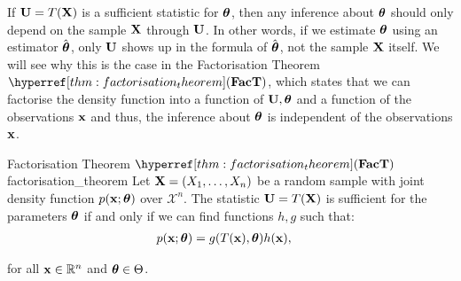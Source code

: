 \begin{definition}
    If ${\bf U}=T({\bf X})$ is a sufficient statistic for $\boldsymbol{\theta}$, then any inference about $\boldsymbol{\theta}$ should only depend on the sample ${\bf X}$ through ${\bf U}$. \color{blue}In other words, if we estimate $\boldsymbol{\theta}$ using an estimator $\hat{\boldsymbol{\theta}}$, only ${\bf U}$ shows up in the formula of $\hat{\boldsymbol{\theta}}$, not the sample ${\bf X}$ itself. We will see why this is the case in the Factorisation Theorem $\FacT$, which states that we can factorise the density function into a function of ${\bf U}, \boldsymbol{\theta}$ and a function of the observations ${\bf x}$ and thus, the inference about $\boldsymbol{\theta}$ is independent of the observations ${\bf x}$\color{black}.
\end{definition}

\begin{theorem}{Factorisation Theorem $\FacT$}{factorisation_theorem}
    Let ${\bf X} = (X_1, \dots, X_n)$ be a random sample with joint density function $p({\bf x};\boldsymbol{\theta})$ over $\mathcal{X}^n$. The statistic ${\bf U}=T({\bf X})$ is sufficient for the parameters $\boldsymbol{\theta}$ if and only if we can find functions $h, g$ such that:
    \begin{align*}
        p({\bf x};\boldsymbol{\theta}) &= g(T({\bf x}), \boldsymbol{\theta})h({\bf x}),
    \end{align*}

    \noindent for all ${\bf x}\in\mathbb{R}^n$ and $\boldsymbol{\theta}\in\Theta$.
\end{theorem}

